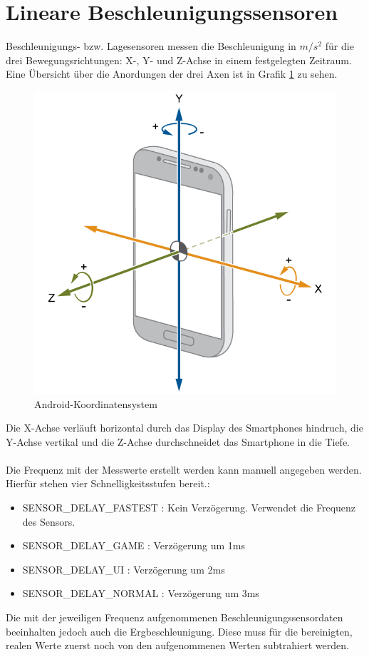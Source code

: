 \documentclass[11pt,a4paper]{report}
\begin{document}
\section{Lineare Beschleunigungssensoren}
Beschleunigungs- bzw. Lagesensoren messen die Beschleunigung in $m/s^2$ für die drei Bewegungsrichtungen: X-, Y- und Z-Achse in einem festgelegten Zeitraum.
Eine Übersicht über die Anordungen der drei Axen ist in Grafik \ref{fig:and_axes} zu sehen.
\begin{figure}[htbp]
  \centering
  \includegraphics[width=.8\textwidth]{images/android_axes.png}
  \caption{Android-Koordinatensystem}
  \label{fig:and_axes}
\end{figure}
Die X-Achse verläuft horizontal durch das Display des Smartphones hindruch, die Y-Achse vertikal und die Z-Achse durchschneidet das Smartphone in die Tiefe.
\\\\
Die Frequenz mit der Messwerte erstellt werden kann manuell angegeben werden.
Hierfür stehen vier Schnelligkeitsstufen bereit.:
\begin{itemize}
  \item SENSOR\_DELAY\_FASTEST : Kein Verzögerung. Verwendet die Frequenz des Sensors.
  \item SENSOR\_DELAY\_GAME : Verzögerung um 1ms
  \item SENSOR\_DELAY\_UI : Verzögerung um 2ms
  \item SENSOR\_DELAY\_NORMAL : Verzögerung um 3ms
\end{itemize}
Die mit der jeweiligen Frequenz aufgenommenen Beschleunigungssensordaten beeinhalten jedoch auch die Ergbeschleunigung.
Diese muss für die bereinigten, realen Werte zuerst noch von den aufgenommenen Werten subtrahiert werden\cite{accel_g}.
\end{document}
